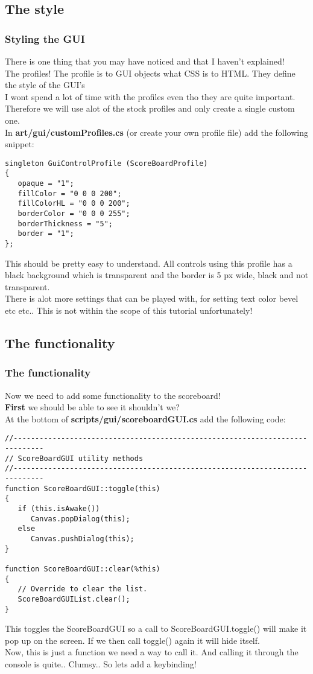 \subsection{The style}
\begin{frame}[fragile]
\frametitle{Styling the GUI}
There is one thing that you may have noticed and that I haven't explained!\\
The profiles! The profile is to GUI objects what CSS is to HTML. They define the style of the GUI's\\
I wont spend a lot of time with the profiles even tho they are quite important. Therefore we will use alot of the stock profiles and only create a single custom one.\\
In {\bf art/gui/customProfiles.cs} (or create your own profile file) add the following snippet:
\TS
\begin{lstlisting}
singleton GuiControlProfile (ScoreBoardProfile)
{
   opaque = "1";
   fillColor = "0 0 0 200";
   fillColorHL = "0 0 0 200";
   borderColor = "0 0 0 255";
   borderThickness = "5";
   border = "1";
};
\end{lstlisting}
This should be pretty easy to understand. All controls using this profile has a black background which is transparent and the border is 5 px wide, black and not transparent.\\
There is alot more settings that can be played with, for setting text color bevel etc etc.. This is not within the scope of this tutorial unfortunately!
\end{frame}

\subsection{The functionality}
\begin{frame}[fragile]
\frametitle{The functionality}
Now we need to add some functionality to the scoreboard!\\
{\bf First} we should be able to see it shouldn't we?\\
At the bottom of {\bf scripts/gui/scoreboardGUI.cs} add the following code:
\TS
\begin{lstlisting}
//-----------------------------------------------------------------------------
// ScoreBoardGUI utility methods
//-----------------------------------------------------------------------------
function ScoreBoardGUI::toggle(this)
{
   if (this.isAwake())
      Canvas.popDialog(this);
   else
      Canvas.pushDialog(this);
}

function ScoreBoardGUI::clear(%this)
{
   // Override to clear the list.
   ScoreBoardGUIList.clear();
}
\end{lstlisting}
This toggles the ScoreBoardGUI so a call to ScoreBoardGUI.toggle() will make it pop up on the screen. If we then call toggle() again it will hide itself.\\
Now, this is just a function we need a way to call it. And calling it through the console is quite.. Clumsy.. So lets add a keybinding!\\
\end{frame}

